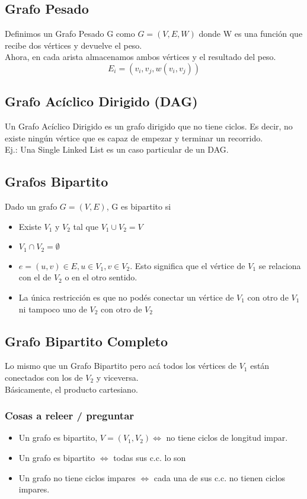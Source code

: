 \documentclass[10pt,a4paper]{article}
\begin{document}
\subsection*{Grafo Pesado}
Definimos un Grafo Pesado G como $G = (V, E, W)$ donde W es una función que recibe dos vértices y devuelve el peso. \\
Ahora, en cada arista almacenamos ambos vértices y el resultado del peso. 
\[E_{i} = (v_{i}, v_{j}, w(v_{i},v_{j}))\]
\subsection*{Grafo Acíclico Dirigido (DAG)}
Un Grafo Acíclico Dirigido es un grafo dirigido que no tiene ciclos. Es decir, no existe ningún vértice que es capaz de empezar y terminar un recorrido. \\
Ej.: Una Single Linked List es un caso particular de un DAG.
\subsection*{Grafos Bipartito}
Dado un grafo $G = (V, E)$, G es bipartito si
\begin{itemize}
    \item Existe $V_{1}$ y $V_{2}$ tal que $V_{1} \cup V_{2} = V$
    \item $V_{1} \cap V_{2} = \emptyset$
    \item $e = (u,v) \in E, u \in V_{1}, v \in V_{2}$. Esto significa que el vértice de $V_{1}$ se relaciona con el de $V_{2}$ o en el otro sentido. 
    \item La única restricción es que no podés conectar un vértice de $V_{1}$ con otro de $V_{1}$ ni tampoco uno de $V_{2}$ con otro de $V_{2}$
\end{itemize}
\subsection*{Grafo Bipartito Completo}
Lo mismo que un Grafo Bipartito pero acá todos los vértices de $V_{1}$ están conectados con los de $V_{2}$ y viceversa. \\
Básicamente, el producto cartesiano.
\subsubsection*{Cosas a releer / preguntar}
\begin{itemize}
    \item Un grafo es bipartito, $V = (V_{1}, V_{2}) \iff$ no tiene ciclos de longitud impar.
    \item Un grafo es bipartito $\iff$ todas sus c.c. lo son 
    \item Un grafo no tiene ciclos impares $\iff$ cada una de sus c.c. no tienen ciclos impares.
\end{itemize}
\end{document}
